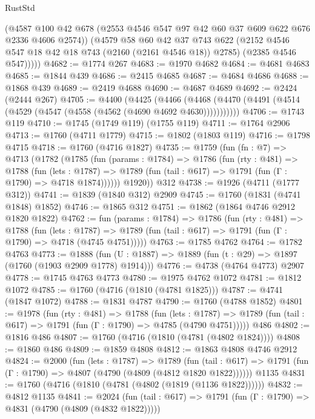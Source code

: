 \begin{lexlean}{RustStd}
\begin{coremodule}
          (@4587 @100 @42 @678 (@2553 @4546 @547 @97 @42 @60 @37 @609 @622 @676 @2336 @4606 @2574))
          (@4579
            @58
            @60
            @42
            @37
            @743
            @622
            (@2152 @4546 @547 @18 @42 @18 @743 (@2160 (@2161 @4546 @18)) @2785)
            (@2385 @4546 @547)))))
@4682 := @1774 @267
@4683 := @1970 @4682
@4684 := @4681 @4683
@4685 := @1844 @439
@4686 := @2415 @4685
@4687 := @4684 @4686
@4688 := @1868 @439
@4689 := @2419 @4688
@4690 := @4687 @4689
@4692 := @2424 (@2444 @267)
@4705 := @4400
    (@4425
      (@4466 (@4468 (@4470 (@4491 (@4514 (@4529 (@4547 (@4558 (@4562 (@4690 @4692 @4630)))))))))))
@4706 := @1743 @119
@4710 := @1745 (@1749 @119) (@1755 @119)
@4711 := @1764 @2906
@4713 := @1760 (@4711 @1779)
@4715 := @1802 (@1803 @119)
@4716 := @1798 @4715
@4718 := @1760 (@4716 @1827)
@4735 := @1759
    (fun (fn : @7) =>
    @4713
      (@1782
        (@1785
          (fun (params : @1784) =>
          @1786
            (fun (rty : @481) =>
            @1788
              (fun (lets : @1787) =>
              @1789 (fun (tail : @617) => @1791 (fun (Γ : @1790) => @4718 @1874))))))
        @1920))
    @312
@4738 := @1926 (@4711 (@1777 @312))
@4741 := @1839 (@1840 @312) @2909
@4745 := @1760 (@1831 (@4741 @1848) @1852)
@4746 := @1865 @312
@4751 := @1862 (@1864 @4746 @2912 @1820 @1822)
@4762 := fun (params : @1784) =>
  @1786
    (fun (rty : @481) =>
    @1788
      (fun (lets : @1787) =>
      @1789 (fun (tail : @617) => @1791 (fun (Γ : @1790) => @4718 (@4745 @4751)))))
@4763 := @1785 @4762
@4764 := @1782 @4763
@4773 := @1888 (fun (U : @1887) => @1889 (fun (t : @29) => @1897 (@1760 (@1903 @2909 @1778) @1914)))
@4776 := @4738 (@4764 @4773) @2907
@4778 := @1745 @4763 @4773
@4780 := @1975 @4762 @1072
@4781 := @1812 @1072
@4785 := @1760 (@4716 (@1810 (@4781 @1825)))
@4787 := @4741 (@1847 @1072)
@4788 := @1831 @4787
@4790 := @1760 (@4788 @1852)
@4801 := @1978
    (fun (rty : @481) =>
    @1788
      (fun (lets : @1787) =>
      @1789 (fun (tail : @617) => @1791 (fun (Γ : @1790) => @4785 (@4790 @4751)))))
    @486
@4802 := @1816 @486
@4807 := @1760 (@4716 (@1810 (@4781 (@4802 @1824))))
@4808 := @1860 @486
@4809 := @1859 @4808
@4812 := @1863 @4808 @4746 @2912
@4824 := @2000
    (fun (lets : @1787) =>
    @1789
      (fun (tail : @617) => @1791 (fun (Γ : @1790) => @4807 (@4790 (@4809 (@4812 @1820 @1822))))))
    @1135
@4831 := @1760 (@4716 (@1810 (@4781 (@4802 (@1819 (@1136 @1822))))))
@4832 := @4812 @1135
@4841 := @2024
    (fun (tail : @617) => @1791 (fun (Γ : @1790) => @4831 (@4790 (@4809 (@4832 @1822)))))

\end{coremodule}
\end{lexlean}
